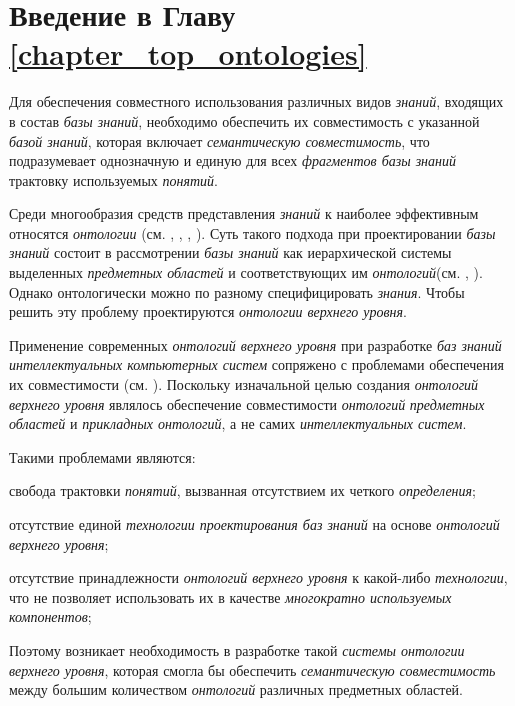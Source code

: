\section*{Введение в Главу \ref{chapter_top_ontologies}}

Для обеспечения совместного использования различных видов \textit{знаний}, входящих в состав \textit{базы знаний}, необходимо обеспечить их совместимость с указанной \textit{базой знаний}, которая включает \textit{семантическую совместимость}, что подразумевает однозначную и единую для всех \textit{фрагментов базы знаний} трактовку используемых \textit{понятий}.

Среди многообразия средств представления \textit{знаний} к наиболее эффективным относятся \textit{онтологии }(см. , , , ). Суть такого подхода при проектировании \textit{базы знаний} состоит в рассмотрении \textit{базы знаний} как иерархической системы выделенных \textit{предметных областей} и соответствующих им \textit{онтологий}(см. , ). Однако онтологически можно по разному специфицировать \textit{знания}. Чтобы решить эту проблему проектируются \textit{онтологии верхнего уровня}.

Применение современных \textit{онтологий верхнего уровня} при разработке \textit{баз знаний} \textit{интеллектуальных компьютерных систем} сопряжено с проблемами обеспечения их совместимости (см. ). Поскольку изначальной целью создания \textit{онтологий верхнего уровня} являлось обеспечение  совместимости \textit{онтологий} \textit{предметных областей} и \textit{прикладных онтологий}, а не самих \textit{интеллектуальных систем}. 

Такими проблемами являются:
\begin{textitemize}
    \item свобода трактовки \textit{понятий}, вызванная отсутствием их четкого \textit{определения};
    \item отсутствие единой \textit{технологии проектирования баз знаний} на основе \textit{онтологий верхнего уровня};
    \item отсутствие принадлежности \textit{онтологий верхнего уровня} к какой-либо \textit{технологии}, что не позволяет использовать их в качестве \textit{многократно используемых компонентов};
\end{textitemize}

Поэтому возникает необходимость в разработке такой \textit{системы онтологии верхнего уровня}, которая смогла бы обеспечить \textit{семантическую совместимость} между большим количеством \textit{онтологий} различных предметных областей.

